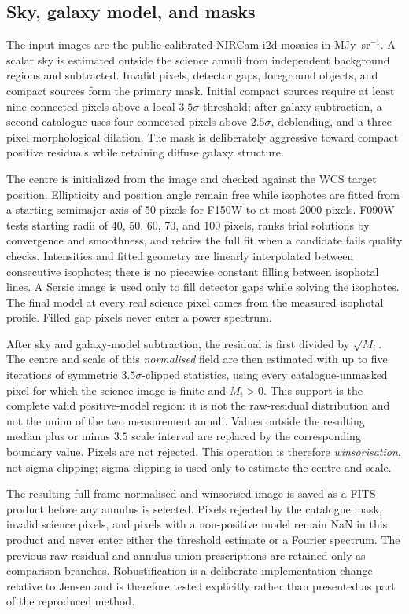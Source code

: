 \documentclass[nodoi,nocopyright]{pas}
\begin{document}
\subsection{Sky, galaxy model, and masks}

The input images are the public calibrated NIRCam i2d mosaics in
MJy~sr$^{-1}$. A scalar sky is estimated outside the science annuli from
independent background regions and subtracted. Invalid pixels, detector gaps,
foreground objects, and compact sources form the primary mask. Initial compact
sources require at least nine connected pixels above a local $3.5\sigma$
threshold; after galaxy subtraction, a second catalogue uses four connected
pixels above $2.5\sigma$, deblending, and a three-pixel morphological dilation.
The mask is deliberately aggressive toward compact positive residuals while
retaining diffuse galaxy structure.

The centre is initialized from the image and checked against the WCS target
position. Ellipticity and position angle remain free while isophotes are fitted
from a starting semimajor axis of 50 pixels for F150W to at most 2000 pixels.
F090W tests starting radii of 40, 50, 60, 70, and 100 pixels, ranks trial
solutions by convergence and smoothness, and retries the full fit when a
candidate fails quality checks. Intensities
and fitted geometry are linearly interpolated between consecutive isophotes;
there is no piecewise constant filling between isophotal lines. A Sersic image
is used only to fill detector gaps while solving the isophotes. The final model
at every real science pixel comes from the measured isophotal profile. Filled
gap pixels never enter a power spectrum.

After sky and galaxy-model subtraction, the residual is first divided by
$\sqrt{M_i}$.  The centre and scale of this \emph{normalised} field are then
estimated with up to five iterations of symmetric $3.5\sigma$-clipped statistics,
using every catalogue-unmasked pixel for which the science image is finite and
$M_i>0$.  This support is the complete valid positive-model region: it is not
the raw-residual distribution and not the union of the two measurement
annuli.  Values outside the resulting median plus or minus $3.5$ scale
interval are replaced by the corresponding boundary value.  Pixels are not
rejected.  This operation is therefore \emph{winsorisation}, not
sigma-clipping; sigma clipping is used only to estimate the centre and scale.

The resulting full-frame normalised and winsorised image is saved as a FITS
product before any annulus is selected.  Pixels rejected by the catalogue
mask, invalid science pixels, and pixels with a non-positive model remain
NaN in this product and never enter either the threshold estimate or a Fourier
spectrum.  The previous raw-residual and annulus-union prescriptions are
retained only as comparison branches.  Robustification is a deliberate
implementation change relative to Jensen and is therefore tested explicitly
rather than presented as part of the reproduced method.
\end{document}
